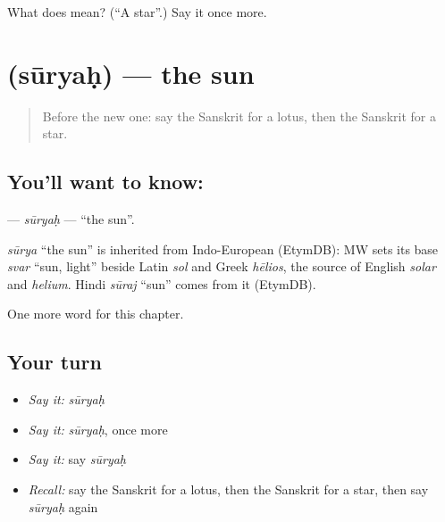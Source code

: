 \begin{tcolorbox}[breakable,colback=teal!4,colframe=teal!35!black,title={Before you move on}]
What does  mean? (\textquotedblleft{}A star\textquotedblright{}.) Say it once more.
\end{tcolorbox}
\section[\texorpdfstring{\sk{सूर्यः} (sūryaḥ)}{सूर्यः (sūryaḥ)}]{ (sūryaḥ) — the sun}

\label{lesson:SA-C112-suryah}



\begin{quote}
Before the new one: say the Sanskrit for a lotus, then the Sanskrit for a star.
\end{quote}

\subsection*{You'll want to know: }
\textbf{} — \emph{sūryaḥ} — \textquotedblleft{}the sun\textquotedblright{}.

\begin{cousinweb}
\emph{sūrya} \textquotedblleft{}the sun\textquotedblright{} is inherited from Indo-European (EtymDB): MW sets its base \emph{svar} \textquotedblleft{}sun, light\textquotedblright{} beside Latin \emph{sol} and Greek \emph{hēlios}, the source of English \emph{solar} and \emph{helium}. Hindi \emph{sūraj} \textquotedblleft{}sun\textquotedblright{} comes from it (EtymDB).
\end{cousinweb}

\begin{grammarlens}[title={What you've built}]
One more word for this chapter.
\end{grammarlens}

\subsection*{Your turn}
\begin{itemize}
\raggedright
  \item \emph{Say it:} \emph{sūryaḥ}
  \item \emph{Say it:} \emph{sūryaḥ}, once more
  \item \emph{Say it:} say \emph{sūryaḥ}
  \item \emph{Recall:} say the Sanskrit for a lotus, then the Sanskrit for a star, then say \emph{sūryaḥ} again
\end{itemize}

